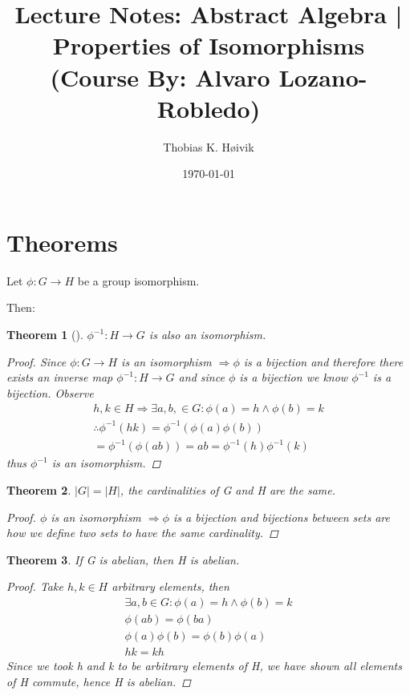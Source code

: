 \documentclass[12pt]{article}
\title{Lecture Notes: Abstract Algebra | Properties of Isomorphisms (Course By: Alvaro Lozano-Robledo)}
\author{Thobias K. Høivik}
\date{\today}
\newtheorem{theorem}{Theorem}
\begin{document}
\maketitle
\section*{Theorems}
Let \(\phi: G \to H\) be a group isomorphism.

\noindent 
Then: 
\begin{theorem}[]
    \(\phi^{-1}: H \to G\) is also an isomorphism.

    \begin{proof}
        Since \(\phi: G \to H\) is an isomorphism \(\Rightarrow \phi\) is a bijection 
        and therefore there exists an inverse map \(\phi^{-1} : H \to G\) 
        and since \(\phi\) is a bijection we know \(\phi^{-1}\) is a bijection.
        Observe
        \begin{gather*}
            h,k \in H \Rightarrow \exists a,b, \in G : 
            \phi(a) = h \land \phi(b) = k \\ 
            \therefore \phi^{-1}(hk) = \phi^{-1}(\phi(a)\phi(b)) \\ 
            = \phi^{-1}(\phi(ab)) = ab = \phi^{-1}(h) \phi^{-1}(k)
        \end{gather*}
        thus \(\phi^{-1}\) is an isomorphism.
    \end{proof}
\end{theorem} 
\begin{theorem}

    \(|G| = |H|\), the cardinalities of G and H are the same.

    \begin{proof}
        \(\phi\) is an isomorphism \(\Rightarrow \phi\) is a bijection 
        and bijections between sets are how we define two sets to 
        have the same cardinality.
    \end{proof}

\end{theorem}

\begin{theorem}
    If G is abelian, then H is abelian. 

    \begin{proof}
        Take \(h,k \in H\) arbitrary elements, then
        \begin{gather*}
            \exists a,b \in G : \phi(a) = h \land \phi(b) = k\\ 
            \phi(ab) = \phi(ba) \\ 
            \phi(a)\phi(b) = \phi(b)\phi(a) \\ 
            hk = kh
        \end{gather*}
        Since we took h and k to be arbitrary elements of H, 
        we have shown all elements of H commute, hence H is abelian. 
    \end{proof}
\end{theorem}
\end{document}
